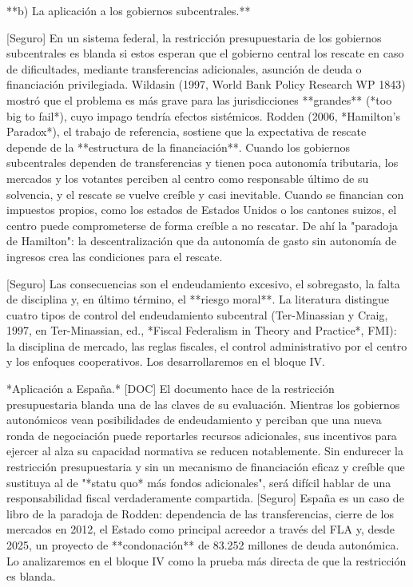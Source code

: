 \documentclass[10pt,a4paper]{article}
\begin{document}
**b) La aplicación a los gobiernos subcentrales.**

[Seguro] En un sistema federal, la restricción presupuestaria de los gobiernos subcentrales es blanda si estos esperan que el gobierno central los rescate en caso de dificultades, mediante transferencias adicionales, asunción de deuda o financiación privilegiada. Wildasin (1997, World Bank Policy Research WP 1843) mostró que el problema es más grave para las jurisdicciones **grandes** (*too big to fail*), cuyo impago tendría efectos sistémicos. Rodden (2006, *Hamilton's Paradox*), el trabajo de referencia, sostiene que la expectativa de rescate depende de la **estructura de la financiación**. Cuando los gobiernos subcentrales dependen de transferencias y tienen poca autonomía tributaria, los mercados y los votantes perciben al centro como responsable último de su solvencia, y el rescate se vuelve creíble y casi inevitable. Cuando se financian con impuestos propios, como los estados de Estados Unidos o los cantones suizos, el centro puede comprometerse de forma creíble a no rescatar. De ahí la "paradoja de Hamilton": la descentralización que da autonomía de gasto sin autonomía de ingresos crea las condiciones para el rescate.

[Seguro] Las consecuencias son el endeudamiento excesivo, el sobregasto, la falta de disciplina y, en último término, el **riesgo moral**. La literatura distingue cuatro tipos de control del endeudamiento subcentral (Ter-Minassian y Craig, 1997, en Ter-Minassian, ed., *Fiscal Federalism in Theory and Practice*, FMI): la disciplina de mercado, las reglas fiscales, el control administrativo por el centro y los enfoques cooperativos. Los desarrollaremos en el bloque IV.

*Aplicación a España.* [DOC] El documento hace de la restricción presupuestaria blanda una de las claves de su evaluación. Mientras los gobiernos autonómicos vean posibilidades de endeudamiento y perciban que una nueva ronda de negociación puede reportarles recursos adicionales, sus incentivos para ejercer al alza su capacidad normativa se reducen notablemente. Sin endurecer la restricción presupuestaria y sin un mecanismo de financiación eficaz y creíble que sustituya al de "*statu quo* más fondos adicionales", será difícil hablar de una responsabilidad fiscal verdaderamente compartida. [Seguro] España es un caso de libro de la paradoja de Rodden: dependencia de las transferencias, cierre de los mercados en 2012, el Estado como principal acreedor a través del FLA y, desde 2025, un proyecto de **condonación** de 83.252 millones de deuda autonómica. Lo analizaremos en el bloque IV como la prueba más directa de que la restricción es blanda.
\end{document}
